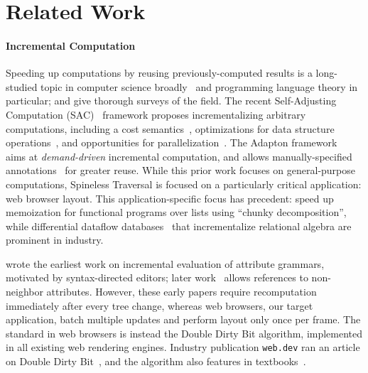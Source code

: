 \section{Related Work}

\paragraph{Incremental Computation}
Speeding up computations
  by reusing previously-computed results
  is a long-studied topic in computer science broadly~\cite{memo}
  and programming language theory in particular;
  \citet{IC-Survey} and \citet{IC-bib}
  give thorough surveys of the field.
The recent Self-Adjusting Computation (SAC)~\cite{SAC} framework
  proposes incrementalizing arbitrary computations,
  including a cost semantics~\cite{SACCost},
  optimizations for data structure operations~\cite{SACTrace},
  and opportunities for parallelization~\cite{PSAC}.
The Adapton framework~\cite{Adapton}
  aims at \emph{demand-driven} incremental computation,
  and allows manually-specified annotations~\citet{AdaptonName}
  for greater reuse.
While this prior work focuses on general-purpose computations,
  Spineless Traversal is focused on a particularly critical application: web browser layout.
This application-specific focus has precedent:
  \citet{ICC} speed up memoization for functional programs over lists
  using ``chunky decomposition'',
  while differential dataflow databases~\cite{DDF}
  that incrementalize relational algebra
  are prominent in industry.

\citet{TR1} wrote the earliest work
  on incremental evaluation of attribute grammars,
  motivated by syntax-directed editors;
  later work~\cite{TR2} allows references
  to non-neighbor attributes.
However, these early papers require recomputation
  immediately after every tree change,
  whereas web browsers, our target application,
  batch multiple updates
  and perform layout only once per frame.
The standard in web browsers is instead
  the Double Dirty Bit algorithm,
  implemented in all existing web rendering engines.
Industry publication \texttt{web.dev}
  ran an article on Double Dirty Bit~\cite{tali-garseil},
  and the algorithm also features in textbooks~\cite{wbe}.
  
